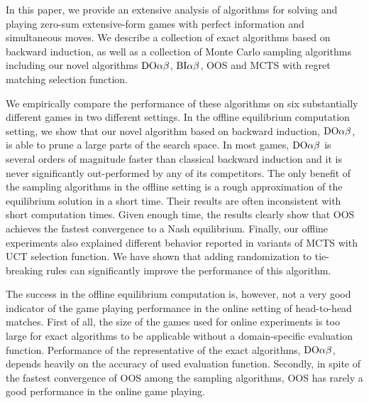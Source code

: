 
In this paper, we provide an extensive analysis of algorithms for solving and playing zero-sum extensive-form games with perfect information and simultaneous moves. We describe a collection of exact algorithms based on backward induction, as well as a collection of Monte Carlo sampling algorithms including our novel algorithms $\textrm{DO}\alpha\beta$, $\textrm{BI}\alpha\beta$, OOS and MCTS with regret matching selection function. 

We empirically compare the performance of these algorithms on six substantially different games in two different settings. In the offline equilibrium computation setting, we show that our novel algorithm based on backward induction, $\textrm{DO}\alpha\beta$, is able to prune a large parts of the search space. In most games, $\textrm{DO}\alpha\beta$ is several orders of magnitude faster than classical backward induction and it is never significantly out-performed by any of its competitors. The only benefit of the sampling algorithms in the offline setting is a rough approximation of the equilibrium solution in a short time. Their results are often inconsistent with short computation times. Given enough time, the results clearly show that OOS achieves the fastest convergence to a Nash equilibrium. Finally, our offline experiments also explained different behavior reported in variants of MCTS with UCT selection function. We have shown that adding randomization to tie-breaking rules can significantly improve the performance of this algorithm.

The success in the offline equilibrium computation is, however, not a very good indicator of the game playing performance in the online setting of head-to-head matches. First of all, the size of the games used for online experiments is too large for exact algorithms to be applicable without a domain-specific evaluation function. Performance of the representative of the exact algorithms, $\textrm{DO}\alpha\beta$, depends heavily on the accuracy of used evaluation function. Secondly, in spite of the fastest convergence of OOS among the sampling algorithms, OOS has rarely a good performance in the online game playing. 


